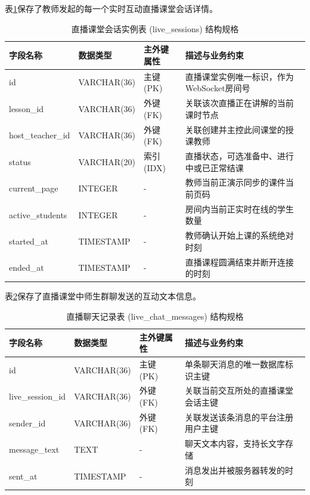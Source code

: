 表\ref{tab:db-live-sessions}保存了教师发起的每一个实时互动直播课堂会话详情。

\begin{table}[H]
\centering
\caption{直播课堂会话实例表 (live\_sessions) 结构规格}
\label{tab:db-live-sessions}
\begin{tabularx}{\textwidth}{lllX}
\toprule
字段名称 & 数据类型 & 主外键属性 & 描述与业务约束 \\
\midrule
id & VARCHAR(36) & 主键 (PK) & 直播课堂实例唯一标识，作为WebSocket房间号 \\
lesson\_id & VARCHAR(36) & 外键 (FK) & 关联该次直播正在讲解的当前课时节点 \\
host\_teacher\_id & VARCHAR(36) & 外键 (FK) & 关联创建并主控此间课堂的授课教师 \\
status & VARCHAR(20) & 索引 (IDX) & 直播状态，可选准备中、进行中或已正常结课 \\
current\_page & INTEGER & - & 教师当前正演示同步的课件当前页码 \\
active\_students & INTEGER & - & 房间内当前正实时在线的学生数量 \\
started\_at & TIMESTAMP & - & 教师确认开始上课的系统绝对时刻 \\
ended\_at & TIMESTAMP & - & 直播课程圆满结束并断开连接的时刻 \\
\bottomrule
\end{tabularx}
\end{table}

表\ref{tab:db-live-chat-messages}保存了直播课堂中师生群聊发送的互动文本信息。

\begin{table}[H]
\centering
\caption{直播聊天记录表 (live\_chat\_messages) 结构规格}
\label{tab:db-live-chat-messages}
\begin{tabularx}{\textwidth}{lllX}
\toprule
字段名称 & 数据类型 & 主外键属性 & 描述与业务约束 \\
\midrule
id & VARCHAR(36) & 主键 (PK) & 单条聊天消息的唯一数据库标识主键 \\
live\_session\_id & VARCHAR(36) & 外键 (FK) & 关联当前交互所处的直播课堂会话主键 \\
sender\_id & VARCHAR(36) & 外键 (FK) & 关联发送该条消息的平台注册用户主键 \\
message\_text & TEXT & - & 聊天文本内容，支持长文字存储 \\
sent\_at & TIMESTAMP & - & 消息发出并被服务器转发的时刻 \\
\bottomrule
\end{tabularx}
\end{table}

